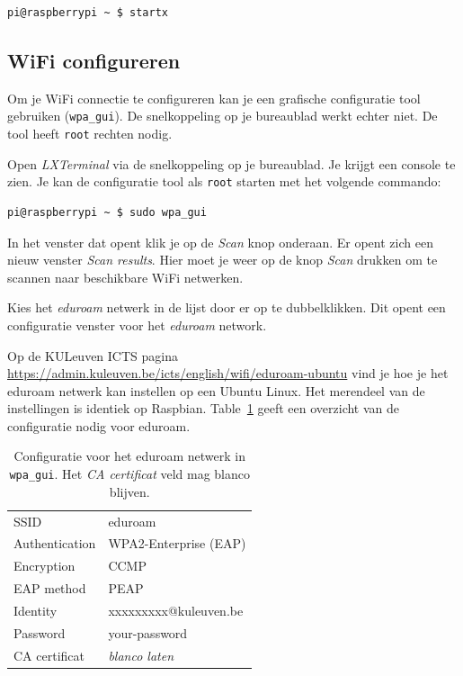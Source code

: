 \documentclass[a4paper]{article}
\begin{document}
\begin{lstlisting}
pi@raspberrypi ~ $ startx
\end{lstlisting}

    \subsection{WiFi configureren}

      Om je WiFi connectie te configureren kan je een grafische
configuratie tool gebruiken (\texttt{wpa\_gui}).  De snelkoppeling op je bureaublad werkt
echter niet.  De tool heeft \texttt{root} rechten nodig.

      Open \emph{LXTerminal} via de snelkoppeling op je bureaublad.  Je
krijgt een console te zien.  Je kan de configuratie tool als
\texttt{root} starten met het volgende commando:

\begin{lstlisting}
pi@raspberrypi ~ $ sudo wpa_gui
\end{lstlisting}

    In het venster dat opent klik je op de \emph{Scan} knop onderaan.
Er opent zich een nieuw venster \emph{Scan results}.  Hier moet je
weer op de knop \emph{Scan} drukken om te scannen naar beschikbare
WiFi netwerken.

    Kies het \emph{eduroam} netwerk in de lijst door er op te
dubbelklikken.  Dit opent een configuratie venster voor het
\emph{eduroam} network.

    Op de KULeuven ICTS pagina
\url{https://admin.kuleuven.be/icts/english/wifi/eduroam-ubuntu} vind
je hoe je het eduroam netwerk kan instellen op een Ubuntu Linux.  Het
merendeel van de instellingen is identiek op Raspbian.
Table~\ref{table:eduroam} geeft een overzicht van de configuratie
nodig voor eduroam.

  \begin{table}[h!]
    \centering
    \begin{tabular}{ll}
      \hline
      SSID & eduroam \\
      Authentication & WPA2-Enterprise (EAP) \\
      Encryption & CCMP \\
      EAP method & PEAP \\
      Identity & xxxxxxxxx@kuleuven.be \\
      Password & your-password \\
      CA certificat & \emph{blanco laten} \\
      \hline
    \end{tabular}
    \caption{Configuratie voor het eduroam netwerk in
\texttt{wpa\_gui}.  Het \emph{CA certificat} veld mag blanco blijven.}
    \label{table:eduroam}
  \end{table}
\end{document}
